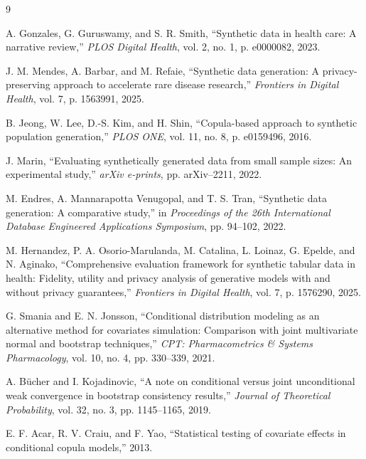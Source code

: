 \documentclass[twoside]{article}
\begin{document}
\begin{thebibliography}{9}

A. Gonzales, G. Guruswamy, and S. R. Smith, ``Synthetic data in health care: A narrative review,'' \textit{PLOS Digital Health}, vol. 2, no. 1, p. e0000082, 2023.

J. M. Mendes, A. Barbar, and M. Refaie, ``Synthetic data generation: A privacy-preserving approach to accelerate rare disease research,'' \textit{Frontiers in Digital Health}, vol. 7, p. 1563991, 2025.

B. Jeong, W. Lee, D.-S. Kim, and H. Shin, ``Copula-based approach to synthetic population generation,'' \textit{PLOS ONE}, vol. 11, no. 8, p. e0159496, 2016.

J. Marin, ``Evaluating synthetically generated data from small sample sizes: An experimental study,'' \textit{arXiv e-prints}, pp. arXiv--2211, 2022.

M. Endres, A. Mannarapotta Venugopal, and T. S. Tran, ``Synthetic data generation: A comparative study,'' in \textit{Proceedings of the 26th International Database Engineered Applications Symposium}, pp. 94--102, 2022.

M. Hernandez, P. A. Osorio-Marulanda, M. Catalina, L. Loinaz, G. Epelde, and N. Aginako, ``Comprehensive evaluation framework for synthetic tabular data in health: Fidelity, utility and privacy analysis of generative models with and without privacy guarantees,'' \textit{Frontiers in Digital Health}, vol. 7, p. 1576290, 2025.

G. Smania and E. N. Jonsson, ``Conditional distribution modeling as an alternative method for covariates simulation: Comparison with joint multivariate normal and bootstrap techniques,'' \textit{CPT: Pharmacometrics \& Systems Pharmacology}, vol. 10, no. 4, pp. 330--339, 2021.


A. B{\"u}cher and I. Kojadinovic, ``A note on conditional versus joint unconditional weak convergence in bootstrap consistency results,'' \textit{Journal of Theoretical Probability}, vol. 32, no. 3, pp. 1145--1165, 2019.


E. F. Acar, R. V. Craiu, and F. Yao, ``Statistical testing of covariate effects in conditional copula models,'' 2013.



\end{thebibliography}
 
\end{document}
